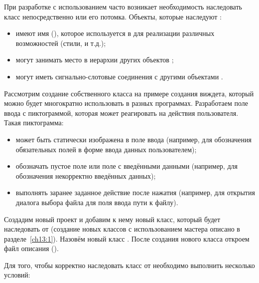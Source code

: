 При разработке с использованием  часто возникает необходимость наследовать класс  непосредственно или
его потомка. Объекты, которые наследуют :

\begin{itemize}
\item имеют имя (), которое используется в  для реализации различных
возможностей (стили,  и т.д.);
\item могут занимать место в иерархии других объектов ;
\item могут иметь сигнально-слотовые соединения с другими объектами .
\end{itemize}

Рассмотрим создание собственного класса на примере создания виждета, который можно будет многократно использовать в
разных программах. Разработаем поле ввода с пиктограммой, которая может реагировать на действия пользователя. Такая
пиктограмма:

\begin{itemize}
\item может быть статически изображена в поле ввода (например, для обозначения обязательных полей в форме ввода данных
пользователем);
\item обозначать пустое поле или поле с введёнными данными (например, для обозначения некорректно введённых данных);
\item выполнять заранее заданное действие после нажатия (например, для открытия диалога выбора файла для поля ввода пути
к файлу).
\end{itemize}

Создадим новый проект и добавим к нему новый класс, который будет наследовать от  (создание новых
классов с использованием мастера описано в разделе~\ref{ch13:1}). Назовём новый класс . После создания
нового класса откроем файл описания ().

Для того, чтобы корректно наследовать класс от  необходимо выполнить несколько условий:

